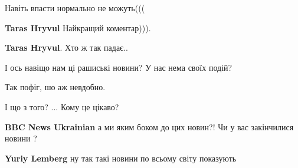 \begin{itemize}
 
Навіть впасти нормально не можуть(((

\begin{itemize}
 
\textbf{Taras Hryvul} Найкращий коментар))).

 
\textbf{Taras Hryvul}. Хто ж так падає..
\end{itemize}


І ось навіщо нам ці рашиські новини? У нас нема своїх подій?


Так пофіг, шо аж невдобно.

 
І що з того? ... Кому це цікаво?

 
\textbf{BBC News Ukrainian} а ми яким боком до цих новин?! Чи у вас закінчилися новини ?


\begin{itemize}
 
\textbf{Yuriy Lemberg} ну так такі новини по всьому світу показують

 

\end{itemize}
\end{itemize}

